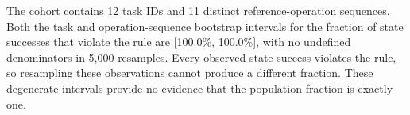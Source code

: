 The cohort contains 12 task IDs and 11 distinct reference-operation sequences. Both the task and operation-sequence bootstrap intervals for the fraction of state successes that violate the rule are [100.0\%, 100.0\%], with no undefined denominators in 5,000 resamples. Every observed state success violates the rule, so resampling these observations cannot produce a different fraction. These degenerate intervals provide no evidence that the population fraction is exactly one.
